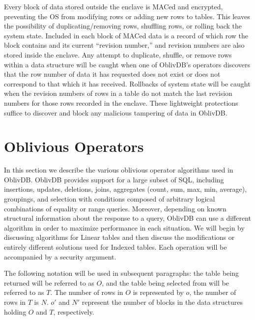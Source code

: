 \documentclass[letterpaper,twocolumn,10pt]{article}
\def\name/{OblivDB}
\begin{document}
Every block of data stored outside the enclave is MACed and encrypted, preventing the OS from modifying rows or adding new rows to tables. This leaves the possibility of duplicating/removing rows, shuffling rows, or rolling back the system state. Included in each block of MACed data is a record of which row the block contains and its current ``revision number,'' and revision numbers are also stored inside the enclave. Any attempt to duplicate, shuffle, or remove rows within a data structure will be caught when one of \name/'s operators discovers that the row number of data it has requested does not exist or does not correspond to that which it has received. Rollbacks of system state will be caught when the revision numbers of rows in a table do not match the last revision numbers for those rows recorded in the enclave. These lightweight protections suffice to discover and block any malicious tampering of data in \name/.

\section{Oblivious Operators}\label{oblivOps}
In this section we describe the various oblivious operator algorithms used in \name/. \name/ provides support for a large subset of SQL, including insertions, updates, deletions, joins, aggregates (count, sum, max, min, average), groupings, and selection with conditions composed of arbitrary logical combinations of equality or range queries. Moreover, depending on known structural information about the response to a query, \name/ can use a different algorithm in order to maximize performance in each situation. We will begin by discussing algorithms for Linear tables and then discuss the modifications or entirely different solutions used for Indexed tables. Each operation will be accompanied by a security argument. 

The following notation will be used in subsequent paragraphs: the table being returned will be referred to as $O$, and the table being selected from will be referred to as $T$. The number of rows in $O$ is represented by $o$, the number of rows in $T$ is $N$. $o'$ and $N'$ represent the number of blocks in the data structures holding $O$ and $T$, respectively. 
\end{document}
